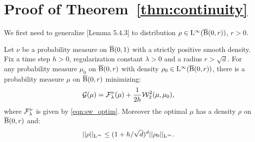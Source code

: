 
\section{Proof of Theorem~\ref{thm:continuity}}

We first need to generalize \cite{bonnotte2013unidimensional}[Lemma 5.4.3] to distribution $\rho \in \mathrm{L}^{\infty}(\operatorname{\overline{B}}(0,r))$, $r >0$.
\begin{thm} \label{thm:implicit_step}
 Let $\nu$ be a probability measure on $\operatorname{\overline{B}}(0,1)$ with a strictly positive smooth density. Fix a time step $h > 0$, regularization constant $\lambda > 0$ and a radius $r > \sqrt{d}$. For any probability measure $\mu_0$ on $\operatorname{\overline{B}}(0, r)$ with density $\rho_0 \in \mathrm{L}^{\infty}(\operatorname{\overline{B}}(0, r))$, there is a probability measure $\mu$ on $\operatorname{\overline{B}}(0,r)$ minimizing:
\[
\mathcal{G}(\mu) = \mathcal{F}^{\nu}_{\lambda} (\mu) + \frac{1}{2h} {\cal W}_2^2(\mu, \mu_0) ,
\]
where $\mathcal{F}^{\nu}_\lambda$ is given by \eqref{eqn:sw_optim}.
Moreover the optimal $\mu$ has a density $\rho$ on $\operatorname{\overline{B}}(0,r)$ and:
\begin{equation} \label{ineq:inf_norm_bound}
||\rho||_{\mathrm{L}^{\infty}} \leq (1 + h/\sqrt{d})^d ||\rho_0||_{\mathrm{L}^{\infty}}.
\end{equation} 
\end{thm}
